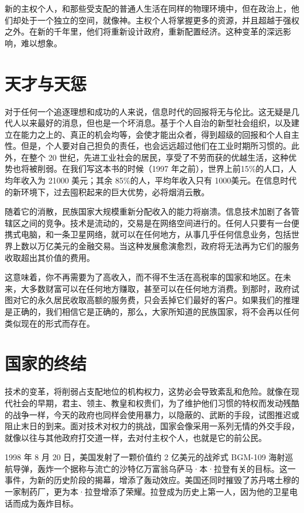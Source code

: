 新的主权个人，和那些受支配的普通人生活在同样的物理环境中，但在政治上，他们却处于一个独立的空间，就像神。主权个人将掌握更多的资源，并且超越于强权之外。在新的千年里，他们将重新设计政府，重新配置经济。这种变革的深远影响，难以想象。



\section{天才与天惩}
对于任何一个追逐理想和成功的人来说，信息时代的回报将无与伦比。这无疑是几代人以来最好的消息，但也是一个坏消息。基于个人自治的新型社会组织，以及建立在能力之上的、真正的机会均等，会使才能出众者，得到超级的回报和个人自主性。但是，个人要对自己担负的责任，也会远远超过他们在工业时期所习惯的。此外，在整个 20 世纪，先进工业社会的居民，享受了不劳而获的优越生活，这种优势也将被削弱。在我们写这本书的时候（1997 年之前），世界上前15\%的人口，人均年收入为 21000 美元；其余 85\%的人，平均年收入只有 1000美元。在信息时代的新环境下，过去囤积起来的巨大优势，必将烟消云散。


随着它的消散，民族国家大规模重新分配收入的能力将崩溃。信息技术加剧了各管辖区之间的竞争。技术是流动的，交易是在网络空间进行的。任何人只要有一台便携式电脑，和一条卫星网络，就可以在任何地方，从事几乎任何信息业务，包括世界上数以万亿美元的金融交易。当这种发展愈演愈烈，政府将无法再为它们的服务收取超出其价值的费用。


这意味着，你不再需要为了高收入，而不得不生活在高税率的国家和地区。在未来，大多数财富可以在任何地方赚取，甚至可以在任何地方消费。到那时，政府试图对它的永久居民收取高额的服务费，只会丢掉它们最好的客户。如果我们的推理是正确的，我们相信它是正确的，那么，大家所知道的民族国家，将不会再以任何类似现在的形式而存在。



\section{国家的终结}
技术的变革，将削弱占支配地位的机构权力，这势必会导致紊乱和危险。就像在现代社会的早期，君主、领主、教皇和权贵们，为了维护他们习惯的特权而发动残酷的战争一样，今天的政府也同样会使用暴力，以隐蔽的、武断的手段，试图推迟或阻止末日的到来。面对技术对权力的挑战，国家会像采用一系列无情的外交手段，就像以往与其他政府打交道一样，去对付主权个人，也就是它的前公民。


1998 年 8 月 20 日，美国发射了一颗价值约 2 亿美元的战斧式 BGM-109 海射巡航导弹，轰炸一个据称与流亡的沙特亿万富翁乌萨马·本·拉登有关的目标。这一事件，为新的历史阶段的揭幕，增添了轰动效应。美国还同时摧毁了苏丹喀土穆的一家制药厂，更为本·拉登增添了荣耀。拉登成为历史上第一人，因为他的卫星电话而成为轰炸目标。


